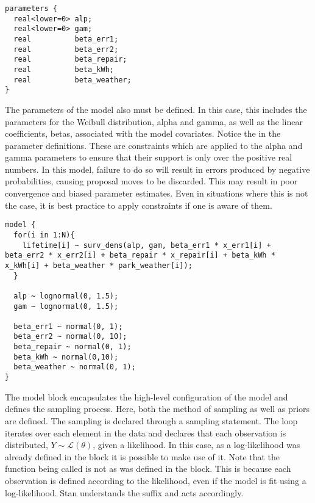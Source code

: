 \begin{lstlisting}
parameters {
  real<lower=0> alp;
  real<lower=0> gam;
  real          beta_err1;
  real          beta_err2;
  real          beta_repair;
  real          beta_kWh;
  real          beta_weather;
}
\end{lstlisting}


The parameters of the model also must be defined. In this case, this includes the parameters for the Weibull distribution, alpha and gamma, as well as the linear coefficients, betas, associated with the model covariates. Notice the  in the parameter definitions. These are constraints which are applied to the alpha and gamma parameters to ensure that their support is only over the positive real numbers. In this model, failure to do so will result in errors produced by negative probabilities, causing proposal moves to be discarded. This may result in poor convergence and biased parameter estimates. Even in situations where this is not the case, it is best practice to apply constraints if one is aware of them.


\begin{lstlisting}
model {
  for(i in 1:N){
    lifetime[i] ~ surv_dens(alp, gam, beta_err1 * x_err1[i] + beta_err2 * x_err2[i] + beta_repair * x_repair[i] + beta_kWh * x_kWh[i] + beta_weather * park_weather[i]);
  }

  alp ~ lognormal(0, 1.5);
  gam ~ lognormal(0, 1.5);
  
  beta_err1 ~ normal(0, 1);
  beta_err2 ~ normal(0, 10);
  beta_repair ~ normal(0, 1);
  beta_kWh ~ normal(0,10);
  beta_weather ~ normal(0, 1);
}
\end{lstlisting}


The model block encapsulates the high-level configuration of the model and defines the sampling process. Here, both the method of sampling as well as priors are defined. The sampling is declared through a sampling statement. The  loop iterates over each element in the data and declares that each observation is distributed, $Y \sim \mathcal {L}(\theta)$,  given a likelihood. In this case, as a log-likelihood was already defined in the  block it is possible to make use of it. Note that the function being called is  not  as was defined in the  block. This is because each observation is defined according to the likelihood, even if the model is fit using a log-likelihood. Stan understands the  suffix and acts accordingly. 

